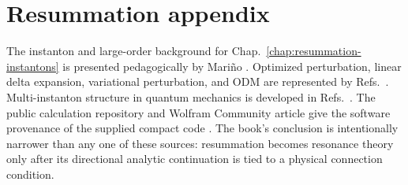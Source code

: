 \section*{Resummation appendix}

The instanton and large-order background for
Chap.~\ref{chap:resummation-instantons} is presented pedagogically by
Mari\~no \cite{Marino:2015Instantons}.  Optimized perturbation, linear delta
expansion, variational perturbation, and ODM are represented by
Refs.~\cite{Stevenson:1981vj,Buckley:1992pc,Duncan:1992ba,
Kleinert:1995hc,Zinn-Justin:2010zzb}.  Multi-instanton structure in quantum
mechanics is developed in Refs.~\cite{Zinn-Justin:1981qzi,Jentschura:2011zza}.
The public calculation repository and Wolfram Community article give the
software provenance of the supplied compact code
\cite{Morikawa:ResummationRepository,Morikawa:2026WolframCommunity}.  The
book's conclusion is intentionally narrower than any one of these sources:
resummation becomes resonance theory only after its directional analytic
continuation is tied to a physical connection condition.

